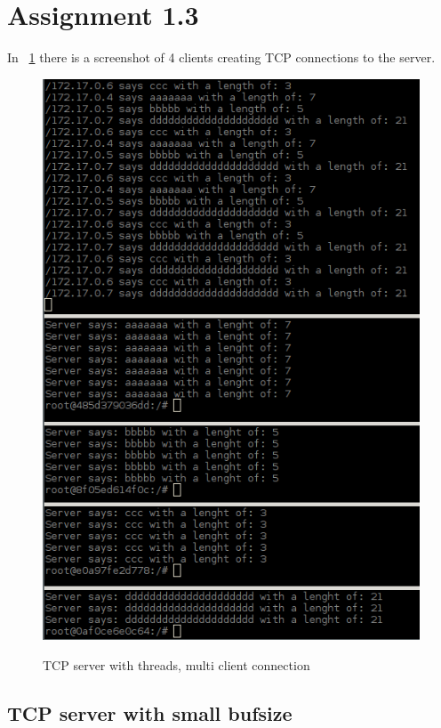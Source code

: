 \documentclass[a4paper,12pt]{article} %
\begin{document}
{\clearpage

\section{Assignment 1.3}
\label{sec:assignment13}
In ~\ref{fig:assignment13} there is a screenshot of 4 clients creating TCP connections to 
the server.

\begin{figure}[H]
    \centering  
    \includegraphics[scale=0.7]{img/assignment13.png}
	\label{fig:assignment13}
	\caption{TCP server with threads, multi client connection}
\end{figure}

\clearpage

\subsection{TCP server with small bufsize}

}
\end{document}
